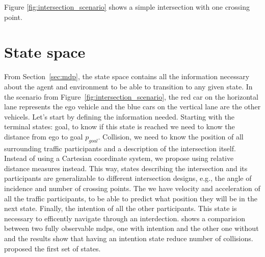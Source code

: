     
  
	

Figure \ref{fig:intersection_scenario} shows a simple intersection with one crossing point. 



\section{State space}
From Section~\ref{sec:mdp}, the state space contains all the information necessary about the agent and environment to be able to transition to any given state. In the scenario from Figure~\ref{fig:intersection_scenario}, the red car on the horizontal lane represents the ego vehicle and the blue cars on the vertical lane are the other vehicels. 
Let's start by defining the information needed. Starting with the terminal states: goal, to know if this state is reached we need to know the distance from ego to goal $p_{goal}$. Collision, we need to know the position of all surrounding traffic participants and a description of the intersection itself. Instead of using a Cartesian coordinate system, we propose using relative distance measures instead. This way, states describing the intersection and its participants are generalizable to different intersection designs, e.g., the angle of incidence and number of crossing points. 
The we have velocity and acceleration of all the traffic participants, to be able to predict what position they will be in the next state. Finally, the intention of all the other participants. This state is necessary to efficently navigate through an interdection. \paperBelief shows a comparision between two fully observable \gls{mdp}s, one with intention and the other one without and the results show that having an intention state reduce number of collisions. 
\paperLSTM proposed the first set of states. %

